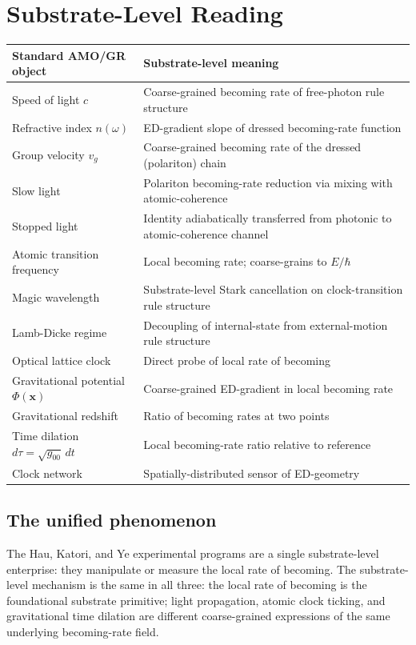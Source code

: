 \documentclass[11pt,a4paper]{article}
\begin{document}
\section{Substrate-Level Reading}

\begin{center}
\footnotesize
\begin{tabular}{@{}p{5.5cm}p{9cm}@{}}
\toprule
Standard AMO/GR object & Substrate-level meaning \\
\midrule
Speed of light $c$ & Coarse-grained becoming rate of free-photon rule structure \\
Refractive index $n(\omega)$ & ED-gradient slope of dressed becoming-rate function \\
Group velocity $v_g$ & Coarse-grained becoming rate of the dressed (polariton) chain \\
Slow light & Polariton becoming-rate reduction via mixing with atomic-coherence \\
Stopped light & Identity adiabatically transferred from photonic to atomic-coherence channel \\
Atomic transition frequency & Local becoming rate; coarse-grains to $E/\hbar$ \\
Magic wavelength & Substrate-level Stark cancellation on clock-transition rule structure \\
Lamb-Dicke regime & Decoupling of internal-state from external-motion rule structure \\
Optical lattice clock & Direct probe of local rate of becoming \\
Gravitational potential $\Phi(\mathbf{x})$ & Coarse-grained ED-gradient in local becoming rate \\
Gravitational redshift & Ratio of becoming rates at two points \\
Time dilation $d\tau = \sqrt{g_{00}}\, dt$ & Local becoming-rate ratio relative to reference \\
Clock network & Spatially-distributed sensor of ED-geometry \\
\bottomrule
\end{tabular}
\end{center}

\subsection{The unified phenomenon}

The Hau, Katori, and Ye experimental programs are a single substrate-level enterprise: they manipulate or measure the local rate of becoming. The substrate-level mechanism is the same in all three: the local rate of becoming is the foundational substrate primitive; light propagation, atomic clock ticking, and gravitational time dilation are different coarse-grained expressions of the same underlying becoming-rate field.
\end{document}
